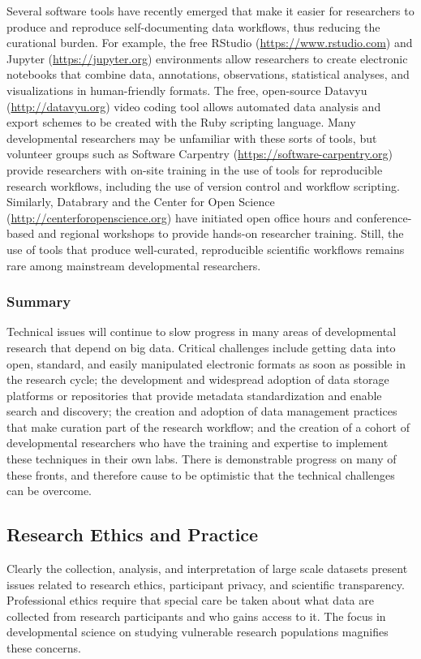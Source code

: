 \documentclass[letterpaper,man,apacite,natbib]{apa6}
\begin{document}
Several software tools have recently emerged that make it easier for researchers to produce and reproduce self-documenting data workflows, thus reducing the curational burden.
For example, the free RStudio (\url{https://www.rstudio.com}) and Jupyter (\url{https://jupyter.org}) environments allow researchers to create electronic notebooks that combine data, annotations, observations, statistical analyses, and visualizations in human-friendly formats.
The free, open-source Datavyu (\url{http://datavyu.org}) video coding tool allows automated data analysis and export schemes to be created with the Ruby scripting language.
Many developmental researchers may be unfamiliar with these sorts of tools, but volunteer groups such as Software Carpentry (\url{https://software-carpentry.org}) provide researchers with on-site training in the use of tools for reproducible research workflows, including the use of version control and workflow scripting.
Similarly, Databrary and the Center for Open Science (\url{http://centerforopenscience.org}) have initiated open office hours and conference-based and regional workshops to provide hands-on researcher training.
Still, the use of tools that produce well-curated, reproducible scientific workflows remains rare among mainstream developmental researchers.
\subsubsection{Summary}
Technical issues will continue to slow progress in many areas of developmental research that depend on big data.
Critical challenges include getting data into open, standard, and easily manipulated electronic formats as soon as possible in the research cycle; the development and widespread adoption of data storage platforms or repositories that provide metadata standardization and enable search and discovery; the creation and adoption of data management practices that make curation part of the research workflow; and the creation of a cohort of developmental researchers who have the training and expertise to implement these techniques in their own labs.
There is demonstrable progress on many of these fronts, and therefore cause to be optimistic that the technical challenges can be overcome.
\subsection{Research Ethics and Practice}
Clearly the collection, analysis, and interpretation of large scale datasets present issues related to research ethics, participant privacy, and scientific transparency.
Professional ethics require that special care be taken about what data are collected from research participants and who gains access to it.
The focus in developmental science on studying vulnerable research populations magnifies these concerns.
\end{document}
